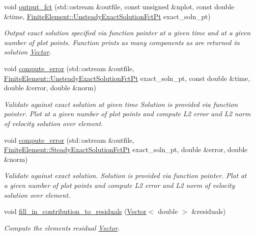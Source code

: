 \begin{DoxyCompactItemize}
void \hyperlink{classoomph_1_1PolarNavierStokesEquations_a89353546dd511060090ef8f3e70e840a}{output\+\_\+fct} (std\+::ostream \&outfile, const unsigned \&nplot, const double \&time, \hyperlink{classoomph_1_1FiniteElement_ad4ecf2b61b158a4b4d351a60d23c633e}{Finite\+Element\+::\+Unsteady\+Exact\+Solution\+Fct\+Pt} exact\+\_\+soln\+\_\+pt)
\begin{DoxyCompactList}\small\item\em Output exact solution specified via function pointer at a given time and at a given number of plot points. Function prints as many components as are returned in solution \hyperlink{classoomph_1_1Vector}{Vector}. \end{DoxyCompactList}\item 
void \hyperlink{classoomph_1_1PolarNavierStokesEquations_af05fc0ab81fac7f46c937220b9ca3ac0}{compute\+\_\+error} (std\+::ostream \&outfile, \hyperlink{classoomph_1_1FiniteElement_ad4ecf2b61b158a4b4d351a60d23c633e}{Finite\+Element\+::\+Unsteady\+Exact\+Solution\+Fct\+Pt} exact\+\_\+soln\+\_\+pt, const double \&time, double \&error, double \&norm)
\begin{DoxyCompactList}\small\item\em Validate against exact solution at given time Solution is provided via function pointer. Plot at a given number of plot points and compute L2 error and L2 norm of velocity solution over element. \end{DoxyCompactList}\item 
void \hyperlink{classoomph_1_1PolarNavierStokesEquations_afcd9707018a88a40b1c8408f711b9eb6}{compute\+\_\+error} (std\+::ostream \&outfile, \hyperlink{classoomph_1_1FiniteElement_a690fd33af26cc3e84f39bba6d5a85202}{Finite\+Element\+::\+Steady\+Exact\+Solution\+Fct\+Pt} exact\+\_\+soln\+\_\+pt, double \&error, double \&norm)
\begin{DoxyCompactList}\small\item\em Validate against exact solution. Solution is provided via function pointer. Plot at a given number of plot points and compute L2 error and L2 norm of velocity solution over element. \end{DoxyCompactList}\item 
void \hyperlink{classoomph_1_1PolarNavierStokesEquations_a0f859172293fdaa604e280084e503b68}{fill\+\_\+in\+\_\+contribution\+\_\+to\+\_\+residuals} (\hyperlink{classoomph_1_1Vector}{Vector}$<$ double $>$ \&residuals)
\begin{DoxyCompactList}\small\item\em Compute the element\textquotesingle{}s residual \hyperlink{classoomph_1_1Vector}{Vector}. \end{DoxyCompactList}\item 

\end{DoxyCompactItemize}
